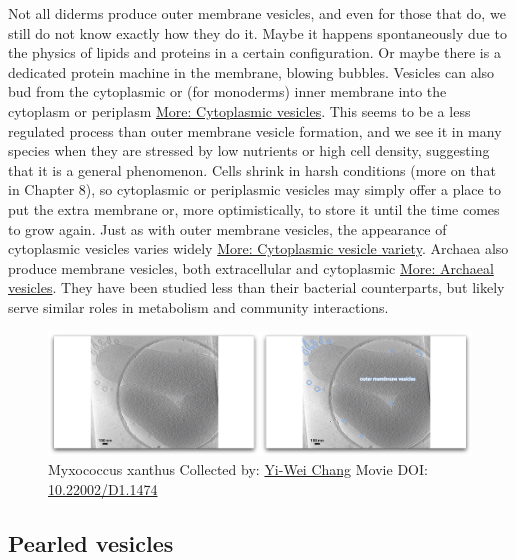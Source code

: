 \documentclass[]{tufte-book}
\begin{document}
Not all diderms produce outer membrane vesicles, and even for those that
do, we still do not know exactly how they do it. Maybe it happens
spontaneously due to the physics of lipids and proteins in a certain
configuration. Or maybe there is a dedicated protein machine in the
membrane, blowing bubbles. Vesicles can also bud from the cytoplasmic or
(for monoderms) inner membrane into the cytoplasm or periplasm
\protect\hyperlink{Cytoplasmic_vesicles}{More: Cytoplasmic vesicles}.
This seems to be a less regulated process than outer membrane vesicle
formation, and we see it in many species when they are stressed by low
nutrients or high cell density, suggesting that it is a general
phenomenon. Cells shrink in harsh conditions (more on that in Chapter
8), so cytoplasmic or periplasmic vesicles may simply offer a place to
put the extra membrane or, more optimistically, to store it until the
time comes to grow again. Just as with outer membrane vesicles, the
appearance of cytoplasmic vesicles varies widely
\protect\hyperlink{Cytoplasmic_vesicle_variety}{More: Cytoplasmic
vesicle variety}. Archaea also produce membrane vesicles, both
extracellular and cytoplasmic
\protect\hyperlink{Archaeal_vesicles}{More: Archaeal vesicles}. They
have been studied less than their bacterial counterparts, but likely
serve similar roles in metabolism and community interactions.





\begin{figure}
\includegraphics{movie_stills/2_4} \caption[Myxococcus xanthus Collected by:
\protect\hyperlink{yi-wei_chang}{Yi-Wei Chang} Movie DOI:
\href{https://doi.org/10.22002/D1.1474}{10.22002/D1.1474}]{Myxococcus xanthus Collected by:
\protect\hyperlink{yi-wei_chang}{Yi-Wei Chang} Movie DOI:
\href{https://doi.org/10.22002/D1.1474}{10.22002/D1.1474}}\label{fig:2-4}
\end{figure}

\hypertarget{Pearled_vesicles}{\subsection{Pearled
vesicles}\label{Pearled_vesicles}}
\end{document}
